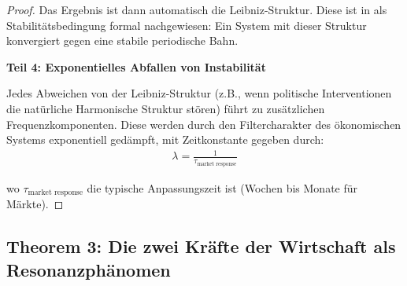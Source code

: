 \documentclass[a4paper,12pt,twoside]{report}
\theoremstyle{definition}
\begin{document}
\begin{proof}
Das Ergebnis ist dann automatisch die Leibniz-Struktur. Diese ist in \cite{epp_signal} als Stabilitätsbedingung formal nachgewiesen: Ein System mit dieser Struktur konvergiert gegen eine stabile periodische Bahn.

\textbf{Teil 4: Exponentielles Abfallen von Instabilität}

Jedes Abweichen von der Leibniz-Struktur (z.B., wenn politische Interventionen die natürliche Harmonische Struktur stören) führt zu zusätzlichen Frequenzkomponenten. Diese werden durch den Filtercharakter des ökonomischen Systems exponentiell gedämpft, mit Zeitkonstante gegeben durch:
\begin{align}
\lambda = \frac{1}{\tau_{\text{market response}}}
\end{align}

wo $\tau_{\text{market response}}$ die typische Anpassungszeit ist (Wochen bis Monate für Märkte).

\end{proof}

\subsection*{Theorem 3: Die zwei Kräfte der Wirtschaft als Resonanzphänomen}
\end{document}
